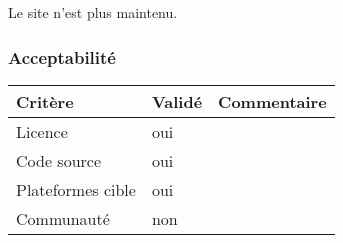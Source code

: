 Le site n'est plus maintenu.

\subsubsection{Acceptabilité}
\begin{tabular}{lll}
\toprule
	Critère				&	Validé		&	Commentaire	\\
\midrule
	Licence				&	oui			&		\\
	Code source			&	oui			&		\\
	Plateformes cible	&	oui			&		\\
	Communauté			&	non			&		\\
\bottomrule
\end{tabular}

